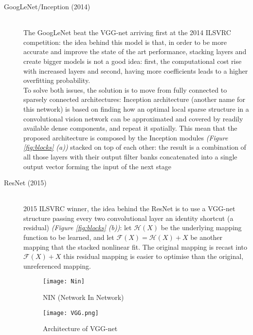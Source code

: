 \documentclass[../main.tex]{subfiles}
\begin{document}
\begin{description}
\item[GoogLeNet/Inception (2014)] \cite{Szegedy2015} \hfill \\ 
The GoogLeNet beat the VGG-net arriving first at the 2014 ILSVRC competition: the idea behind this model is that, in order to be more accurate and improve the state of the art performance, stacking layers and create bigger models is not a good idea: first, the computational cost rise with increased layers and second, having more coefficients leads to a higher overfitting probability. \\ 
To solve both issues, the solution is to move from fully connected to sparsely connected architectures: Inception architecture (another name for this network) is based on finding how an optimal local sparse structure in a convolutional vision network can be approximated and covered by readily available dense components, and repeat it spatially.\cite{Szegedy2015}
This mean that the proposed architecture is composed by the Inception modules \textit{(Figure \ref{fig:blocks} (a))} stacked on top of each other: the result is a combination of all those layers with their output filter banks concatenated into a single output vector forming the input of the next stage
\item[ResNet (2015)] \cite{Wu2017} \hfill \\
2015 ILSVRC winner, the idea behind the ResNet is to use a VGG-net structure passing every two convolutional layer an identity shortcut (a residual) \textit{(Figure \ref{fig:blocks} (b))}: let $\mathcal {H}(X)$ be the underlying mapping function to be learned, and let $\mathcal{F}(X)=\mathcal {H}(X) + X $ be another mapping that the stacked nonlinear fit. The original mapping is recast into $\mathcal{F}(X)+X$ this residual mapping is easier to optimise than the original, unreferenced mapping. \cite{Wu2017}


\begin{figure}[!hb]
  \centering
  \texttt{[image: Nin]}
  \caption{NIN (Network In Network) \cite{Lin2013}}
  \label{fig:nin}
\end{figure}

\begin{figure}[!hb]
  \centering
  \texttt{[image: VGG.png]}
  \caption{Architecture of VGG-net}
  \label{fig:vggnet}
\end{figure}


\end{description}
\end{document}
